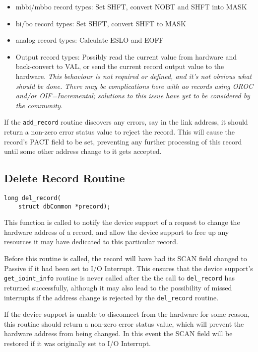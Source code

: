 \begin{itemize}
\item mbbi/mbbo record types:
Set SHFT, convert NOBT and SHFT into MASK

\item bi/bo record types:
Set SHFT, convert SHFT to MASK

\item analog record types:
Calculate ESLO and EOFF

\item Output record types:
Possibly read the current value from hardware and back-convert to VAL, or send the current record output value to the hardware. \emph{This behaviour is not required or defined, and it's not obvious what should be done. There may be complications here with ao records using OROC and/or OIF=Incremental; solutions to this issue have yet to be considered by the community.}

\end{itemize}

If the \verb|add_record| routine discovers any errors, say in the link address, it should return a non-zero error status value to reject the record.
This will cause the record's PACT field to be set, preventing any further processing of this record until some other address change to it gets accepted.

\subsection{Delete Record Routine}

\begin{verbatim}
long del_record(
    struct dbCommon *precord);
\end{verbatim}

This function is called to notify the device support of a request to change the hardware address of a record, and allow the device support to free up any resources it may have dedicated to this particular record.

Before this routine is called, the record will have had its SCAN field changed to Passive if it had been set to I/O Interrupt.
This ensures that the device support's \verb|get_ioint_info| routine is never called after the the call to \verb|del_record| has returned successfully, although it may also lead to the possibility of missed interrupts if the address change is rejected by the \verb|del_record| routine.

If the device support is unable to disconnect from the hardware for some reason, this routine should return a non-zero error status value, which will prevent the hardware address from being changed.
In this event the SCAN field will be restored if it was originally set to I/O Interrupt.

